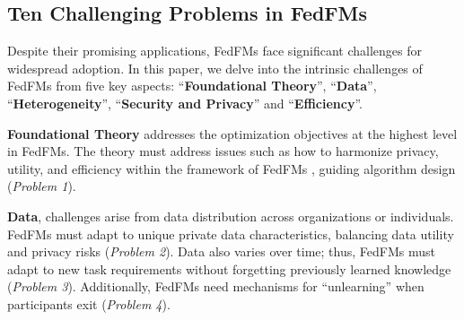 \begin{table*}[ht]
{ }
	\end{table*}


\subsection{Ten Challenging Problems in FedFMs}

Despite their promising applications, FedFMs face significant challenges for widespread adoption. 
In this paper, we delve into the intrinsic challenges of FedFMs from five key aspects: “\textbf{Foundational Theory}”, “\textbf{Data}”, “\textbf{Heterogeneity}”, “\textbf{Security and Privacy}” and “\textbf{Efficiency}”.

\textbf{Foundational Theory} addresses the optimization objectives at the highest level in FedFMs. The theory must address issues such as how to harmonize privacy, utility, and efficiency within the framework of FedFMs \cite{zhang2022no}, guiding algorithm design (\textit{Problem 1}). 

\textbf{Data}, challenges arise from data distribution across organizations or individuals. FedFMs must adapt to unique private data characteristics, balancing data utility and privacy risks \cite{kang2023grounding} (\textit{Problem 2}). Data also varies over time; thus, FedFMs must adapt to new task requirements without forgetting previously learned knowledge \cite{yang2024federatedcl} (\textit{Problem 3}). Additionally, FedFMs need mechanisms for “unlearning” when participants exit \cite{liu2024survey} (\textit{Problem 4}).

